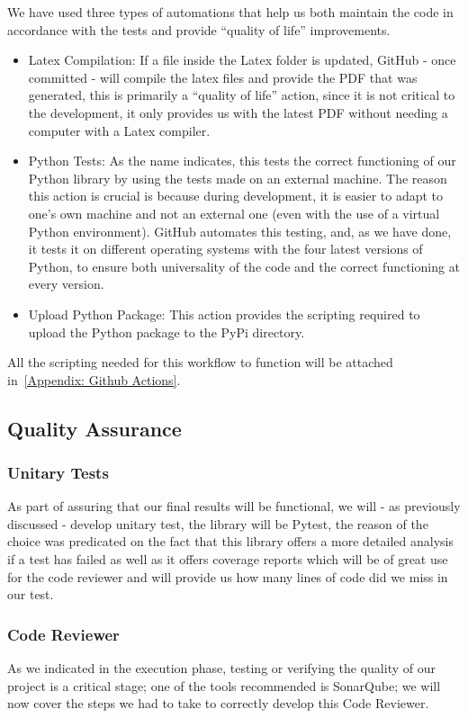 We have used three types of automations that help us both maintain the code in accordance with the tests and provide ``quality of life'' improvements.
\begin{itemize}
    \item Latex Compilation: If a file inside the Latex folder is updated, GitHub - once committed - will compile the latex files and provide the PDF that was generated, this is primarily a ``quality of life'' action, since it is not critical to the development, it only provides us with the latest PDF without needing a computer with a Latex compiler.
    \item Python Tests: As the name indicates, this tests the correct functioning of our Python library by using the tests made on an external machine. The reason this action is crucial is because during development, it is easier to adapt to one's own machine and not an external one (even with the use of a virtual Python environment). GitHub automates this testing, and, as we have done, it tests it on different operating systems with the four latest versions of Python, to ensure both universality of the code and the correct functioning at every version.
    \item Upload Python Package: This action provides the scripting required to upload the Python package to the PyPi directory.
\end{itemize}
All the scripting needed for this workflow to function will be attached in~\hyperlink{Appendix:GithubActions}{[Appendix: Github Actions]}.
\subsection{Quality Assurance}
\subsubsection{Unitary Tests}
As part of assuring that our final results will be functional, we will - as previously discussed - develop unitary test, the library will be Pytest, the reason of the choice was predicated on the fact that this library offers a more detailed analysis if a test has failed as well as it offers coverage reports which will be of great use for the code reviewer and will provide us how many lines of code did we miss in our test.

\subsubsection{Code Reviewer}
As we indicated in the execution phase, testing or verifying the quality of our project is a critical stage; one of the tools recommended is SonarQube; we will now cover the steps we had to take to correctly develop this Code Reviewer.

